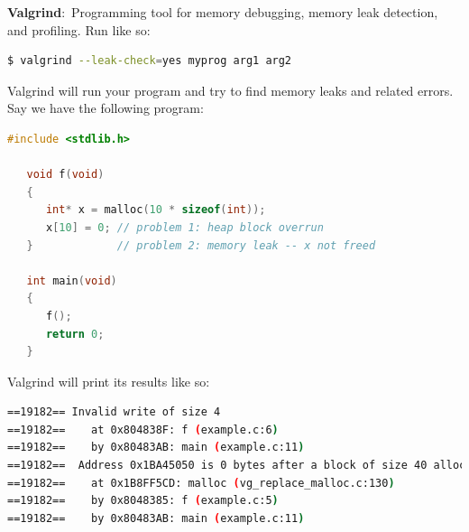 \documentclass[nobib]{tufte-handout}
\newcommand{\defn}[2]{\noindent\textbf{#1}:\ #2}
\begin{document}
\defn{Valgrind}{Programming tool for 
memory debugging, memory leak detection, and profiling.}
Run like so:
\begin{lstlisting}[language=bash,caption=valgrind]
   $ valgrind --leak-check=yes myprog arg1 arg2
\end{lstlisting}
Valgrind will run your program and try to find memory leaks and 
related errors. Say we have the following program: 
\begin{lstlisting}[language=C,caption=valgrind example]
   #include <stdlib.h>

   void f(void)
   {
      int* x = malloc(10 * sizeof(int));
      x[10] = 0; // problem 1: heap block overrun
   }             // problem 2: memory leak -- x not freed
 
   int main(void)
   {
      f();
      return 0;
   }
\end{lstlisting}
Valgrind will print its results like so:
\begin{lstlisting}[language=bash,caption=valgrind]
==19182== Invalid write of size 4
==19182==    at 0x804838F: f (example.c:6)
==19182==    by 0x80483AB: main (example.c:11)
==19182==  Address 0x1BA45050 is 0 bytes after a block of size 40 allocd
==19182==    at 0x1B8FF5CD: malloc (vg_replace_malloc.c:130)
==19182==    by 0x8048385: f (example.c:5)
==19182==    by 0x80483AB: main (example.c:11)
\end{lstlisting}

\pagebreak 
\end{document}
